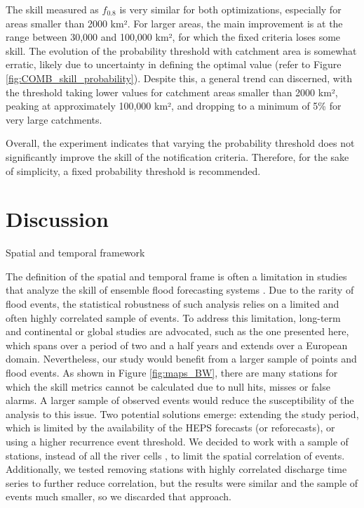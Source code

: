 \documentclass[preprint,12pt,authoryear]{elsarticle}
\begin{document}
The skill measured as $f_{0.8}$ is very similar for both optimizations, especially for areas smaller than 2000 km². For larger areas, the main improvement is at the range between 30,000 and 100,000 km², for which the fixed criteria loses some skill. The evolution of the probability threshold with catchment area is somewhat erratic, likely due to uncertainty in defining the optimal value (refer to Figure \ref{fig:COMB_skill_probability}). Despite this, a general trend can discerned, with the threshold taking lower values for catchment areas smaller than 2000 km², peaking at approximately 100,000 km², and dropping to a minimum of 5\% for very large catchments. 

Overall, the experiment indicates that varying the probability threshold does not significantly improve the skill of the notification criteria. Therefore, for the sake of simplicity, a fixed probability threshold is recommended. 

\section{Discussion}
\label{sec:discussion}

Spatial and temporal framework

The definition of the spatial and temporal frame is often a limitation in studies that analyze the skill of ensemble flood forecasting systems \cite{Cloke2009}. Due to the rarity of flood events, the statistical robustness of such analysis relies on a limited and often highly correlated sample of events. To address this limitation, long-term and continental or global studies are advocated, such as the one presented here, which spans over a period of two and a half years and extends over a European domain. Nevertheless, our study would benefit from a larger sample of points and flood events. As shown in Figure \ref{fig:maps_BW}, there are many stations for which the skill metrics cannot be calculated due to null hits, misses or false alarms. A larger sample of observed events would reduce the susceptibility of the analysis to this issue. Two potential solutions emerge: extending the study period, which is limited by the availability of the HEPS forecasts (or reforecasts), or using a higher recurrence event threshold. We decided to work with a sample of stations, instead of all the river cells \cite{Bartholmes2009}, to limit the spatial correlation of events. Additionally, we tested removing stations with highly correlated discharge time series to further reduce correlation, but the results were similar and the sample of events much smaller, so we discarded that approach. 
\end{document}
